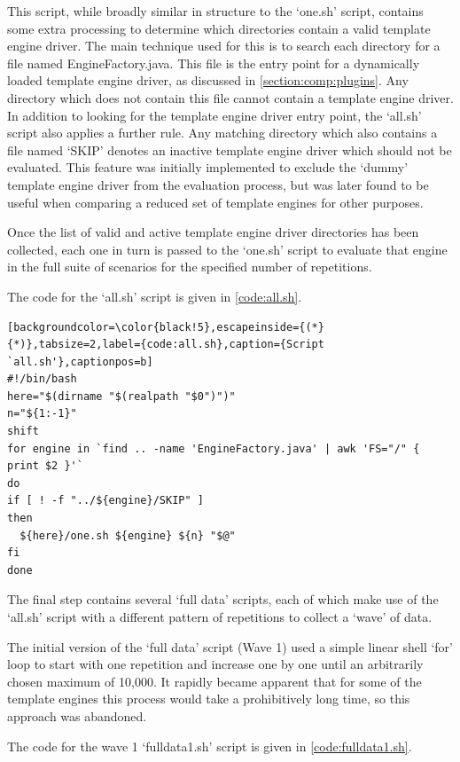 This script, while broadly similar in structure to the `one.sh' script, contains some extra processing to determine which directories contain a valid template engine driver. The main technique used for this is to search each directory for a file named EngineFactory.java. This file is the entry point for a dynamically loaded template engine driver, as discussed in \autoref{section:comp:plugins}. Any directory which does not contain this file cannot contain a template engine driver. In addition to looking for the template engine driver entry point, the `all.sh' script also applies a further rule. Any matching directory which also contains a file named `SKIP' denotes an inactive template engine driver which should not be evaluated. This feature was initially implemented to exclude the `dummy' template engine driver from the evaluation process, but was later found to be useful when comparing a reduced set of template engines for other purposes.

Once the list of valid and active template engine driver directories has been collected, each one in turn is passed to the `one.sh' script to evaluate that engine in the full suite of scenarios for the specified number of repetitions.

The code for the `all.sh' script is given in \autoref{code:all.sh}.

\begin{lstlisting}[backgroundcolor=\color{black!5},escapeinside={(*}{*)},tabsize=2,label={code:all.sh},caption={Script `all.sh'},captionpos=b]
#!/bin/bash
here="$(dirname "$(realpath "$0")")"
n="${1:-1}"
shift
for engine in `find .. -name 'EngineFactory.java' | awk 'FS="/" { print $2 }'`
do
if [ ! -f "../${engine}/SKIP" ]
then
  ${here}/one.sh ${engine} ${n} "$@"
fi
done
\end{lstlisting}

The final step contains several `full data' scripts, each of which make use of the `all.sh' script with a different pattern of repetitions to collect a `wave' of data.

The initial version of the `full data' script (Wave 1) used a simple linear shell `for' loop to start with one repetition and increase one by one until an arbitrarily chosen maximum of 10,000. It rapidly became apparent that for some of the template engines this process would take a prohibitively long time, so this approach was abandoned.

The code for the wave 1 `fulldata1.sh' script is given in \autoref{code:fulldata1.sh}.

